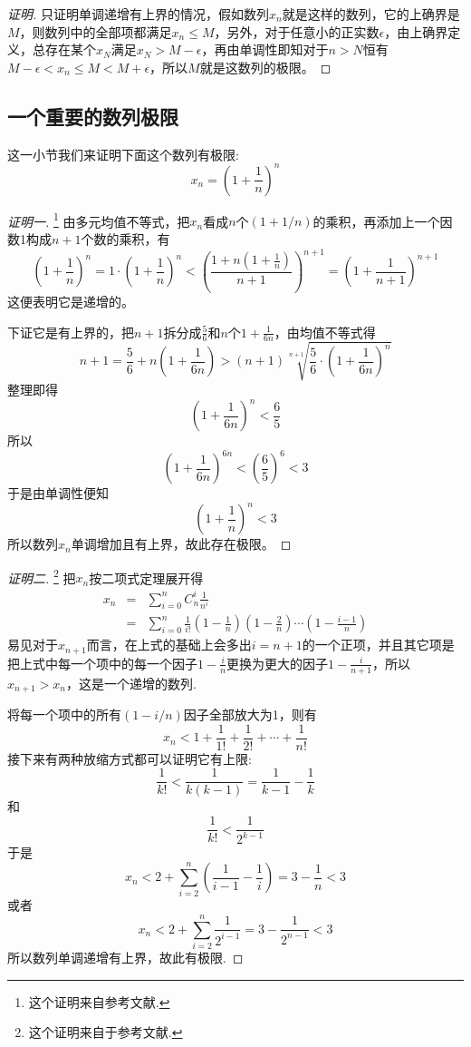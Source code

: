 \begin{proof}[证明]
  只证明单调递增有上界的情况，假如数列$x_n$就是这样的数列，它的上确界是$M$，则数列中的全部项都满足$x_n \leqslant M$，另外，对于任意小的正实数$\epsilon$，由上确界定义，总存在某个$x_N$满足$x_N>M-\epsilon$，再由单调性即知对于$n>N$恒有$M-\epsilon < x_n \leqslant M < M+\epsilon$，所以$M$就是这数列的极限。
\end{proof}


\subsection{一个重要的数列极限}
\label{sec:a-import-sequence-limit}

这一小节我们来证明下面这个数列有极限:
\[ x_n=\left( 1+\frac{1}{n} \right)^n \]

\begin{proof}[证明一]\footnote{这个证明来自参考文献\cite{olympic-math}.}
  由多元均值不等式，把$x_n$看成$n$个$(1+1/n)$的乘积，再添加上一个因数1构成$n+1$个数的乘积，有
  \[ \left( 1+\frac{1}{n} \right)^n = 1 \cdot \left( 1+\frac{1}{n} \right)^n < \left( \frac{1+n\left( 1+\frac{1}{n} \right)}{n+1} \right)^{n+1} = \left( 1+\frac{1}{n+1} \right)^{n+1} \]
  这便表明它是递增的。

  下证它是有上界的，把$n+1$拆分成$\frac{5}{6}$和$n$个$1+\frac{1}{6n}$，由均值不等式得
  \[ n+1 = \frac{5}{6} + n \left( 1+\frac{1}{6n} \right) > (n+1)\sqrt[n+1]{\frac{5}{6} \cdot \left( 1+\frac{1}{6n} \right)^n} \]
  整理即得
  \[ \left( 1+\frac{1}{6n} \right)^n < \frac{6}{5} \]
  所以
  \[ \left( 1+\frac{1}{6n} \right)^{6n} < \left( \frac{6}{5} \right)^6 < 3 \]
  于是由单调性便知
  \[ \left( 1+\frac{1}{n} \right)^n < 3 \]
  所以数列$x_n$单调增加且有上界，故此存在极限。
\end{proof}

\begin{proof}[证明二]\footnote{这个证明来自于参考文献\cite{math-analysis}.}
  把$x_n$按二项式定理展开得
  \begin{eqnarray*}
    x_n & = & \sum_{i=0}^n C_n^i \frac{1}{n^i} \\
    & = & \sum_{i=0}^n \frac{1}{i!}\left( 1-\frac{1}{n} \right) \left( 1-\frac{2}{n} \right)\cdots \left( 1-\frac{i-1}{n} \right)
  \end{eqnarray*}
  易见对于$x_{n+1}$而言，在上式的基础上会多出$i=n+1$的一个正项，并且其它项是把上式中每一个项中的每一个因子$1-\frac{i}{n}$更换为更大的因子$1-\frac{i}{n+1}$，所以$x_{n+1}>x_n$，这是一个递增的数列.

  将每一个项中的所有$(1-i/n)$因子全部放大为1，则有
  \[  x_n < 1+\frac{1}{1!}+\frac{1}{2!}+\cdots+\frac{1}{n!} \]
  接下来有两种放缩方式都可以证明它有上限:
  \[ \frac{1}{k!} < \frac{1}{k(k-1)} = \frac{1}{k-1} - \frac{1}{k} \]
  和
  \[ \frac{1}{k!} < \frac{1}{2^{k-1}} \]
  于是
  \[ x_n < 2 + \sum_{i=2}^n \left( \frac{1}{i-1}-\frac{1}{i} \right) = 3-\frac{1}{n} < 3 \]
  或者
  \[ x_n < 2 + \sum_{i=2}^n \frac{1}{2^{i-1}} = 3-\frac{1}{2^{n-1}} < 3 \]
  所以数列单调递增有上界，故此有极限.
\end{proof}



